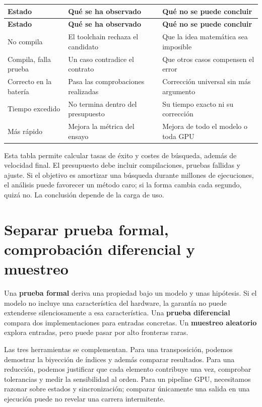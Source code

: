 \documentclass[12pt,a4paper,oneside]{report}
\begin{document}
{\small
\begin{longtable}{@{}P{0.28\textwidth}P{0.32\textwidth}P{0.34\textwidth}@{}}
\toprule
\textbf{Estado} & \textbf{Qué se ha observado} & \textbf{Qué no se puede concluir}\\
\midrule
\endfirsthead
\toprule
\textbf{Estado} & \textbf{Qué se ha observado} & \textbf{Qué no se puede concluir}\\
\midrule
\endhead
No compila & El toolchain rechaza el candidato & Que la idea matemática sea imposible\\
Compila, falla prueba & Un caso contradice el contrato & Que otros casos compensen el error\\
Correcto en la batería & Pasa las comprobaciones realizadas & Corrección universal sin más argumento\\
Tiempo excedido & No termina dentro del presupuesto & Su tiempo exacto ni su corrección\\
Más rápido & Mejora la métrica del ensayo & Mejora de todo el modelo o toda GPU\\
\bottomrule
\end{longtable}
}
Esta tabla permite calcular tasas de éxito y costes de búsqueda, además de velocidad final. El presupuesto debe incluir compilaciones, pruebas fallidas y ajuste. Si el objetivo es amortizar una búsqueda durante millones de ejecuciones, el análisis puede favorecer un método caro; si la forma cambia cada segundo, quizá no. La conclusión depende de la carga de uso.

\section{Separar prueba formal, comprobación diferencial y muestreo}
Una \textbf{prueba formal} deriva una propiedad bajo un modelo y unas hipótesis. Si el modelo no incluye una característica del hardware, la garantía no puede extenderse silenciosamente a esa característica. Una \textbf{prueba diferencial} compara dos implementaciones para entradas concretas. Un \textbf{muestreo aleatorio} explora entradas, pero puede pasar por alto fronteras raras.

Las tres herramientas se complementan. Para una transposición, podemos demostrar la biyección de índices y además comparar resultados. Para una reducción, podemos justificar que cada elemento contribuye una vez, comprobar tolerancias y medir la sensibilidad al orden. Para un pipeline GPU, necesitamos razonar sobre estados y sincronización; comparar únicamente una salida en una ejecución puede no revelar una carrera intermitente.
\end{document}
